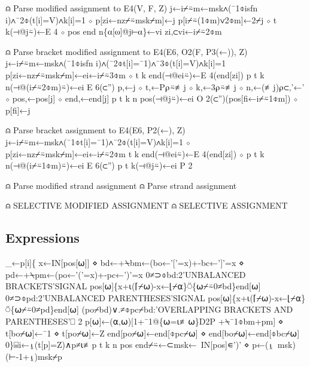 \documentclass{article}%
\begin{document}
⍝ Parse modified assignment to E4(V, F, Z)
j←i⌿⍨m←msk∧(¯1⌽isfn i)∧¯2⌽(t[i]=V)∧k[i]=1 ⋄ p[zi←nz⌿⍨msk⌿m]←j
p[i⌿⍨(1⌽m)∨2⌽m]←2⌿j ⋄ t k(⊣@j⍨)←E 4 ⋄ pos end n\{⍺[⍵]@j⊢⍺\}←vi zi,⊂vi←i⌿⍨2⌽m

⍝ Parse bracket modified assignment to E4(E6, O2(F, P3(←)), Z)
j←i⌿⍨m←msk∧(¯1⌽isfn i)∧(¯2⌽t[i]=¯1)∧¯3⌽(t[i]=V)∧k[i]=1
p[zi←nz⌿⍨msk⌿m]←ei←i⌿⍨3⌽m ⋄ t k end(⊣@ei⍨)←E 4(end[zi])
p t k n(⊣@(i⌿⍨2⌽m)⍨)←ei E 6(⊂'')
p,←j ⋄ t,←P⍴⍨≢j ⋄ k,←3⍴⍨≢j ⋄ n,←(≢j)⍴⊂,'←' ⋄ pos,←pos[j] ⋄ end,←end[j]
p t k n pos(⊣@j⍨)←ei O 2(⊂'')(pos[fi←i⌿⍨1⌽m]) ⋄ p[fi]←j

⍝ Parse bracket assignment to E4(E6, P2(←), Z)
j←i⌿⍨m←msk∧(¯1⌽t[i]=¯1)∧¯2⌽(t[i]=V)∧k[i]=1 ⋄ p[zi←nz⌿⍨msk⌿m]←ei←i⌿⍨2⌽m
t k end(⊣@ei⍨)←E 4(end[zi]) ⋄ p t k n(⊣@(i⌿⍨1⌽m)⍨)←ei E 6(⊂'')
p t k(⊣@j⍨)←ei P 2

⍝ Parse modified strand assignment
⍝ Parse strand assignment

⍝ SELECTIVE MODIFIED ASSIGNMENT
⍝ SELECTIVE ASSIGNMENT
\nwendcode{}\nwdocspar

\subsection{Expressions}

\nwenddocs{}\endmoddef\nwstartdeflinemarkup{}\nwenddeflinemarkup
_←p[i]\{
        x←IN[pos[⍵]] ⋄ bd←+⍀bm←(bo←'['=x)+-bc←']'=x ⋄ pd←+⍀pm←(po←'('=x)+-pc←')'=x
        0≠⊃⌽bd:2'UNBALANCED BRACKETS'SIGNAL pos[⍵]\{x+⍳(⌈⌿⍵)-x←⌊⌿⍺\}⍥\{⍵⌿⍨0≠bd\}end[⍵]
        0≠⊃⌽pd:2'UNBALANCED PARENTHESES'SIGNAL pos[⍵]\{x+⍳(⌈⌿⍵)-x←⌊⌿⍺\}⍥\{⍵⌿⍨0≠pd\}end[⍵]
        (po⌿bd)∨.≠⌽pc⌿bd:'OVERLAPPING BRACKETS AND PARENTHESES'⎕ 2
        p[⍵]←(⍺,⍵)[1+¯1@\{⍵=⍳≢⍵\}D2P +⍀¯1⌽bm+pm] ⋄ t[bo⌿⍵]←¯1 ⋄ t[po⌿⍵]←Z
        end[po⌿⍵]←end[⌽pc⌿⍵] ⋄ end[bo⌿⍵]←end[⌽bc⌿⍵]
0\}⌸i←⍸(t[p]=Z)∧p≠⍳≢p
t k n pos end⌿⍨←⊂msk←~IN[pos]∊')' ⋄ p←(⍸~msk)(⊢-1+⍸)msk⌿p
\nwendcode{}\nwdocspar
\end{document}
